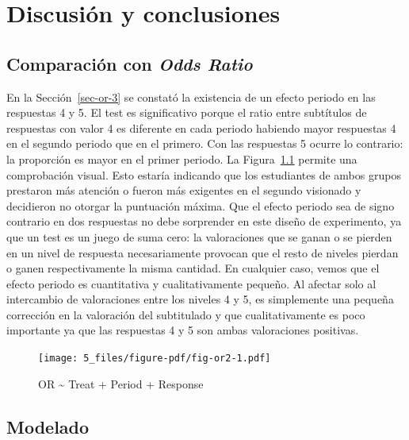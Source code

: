 \documentclass[
  12pt,
  a4paper,
  extrafontsizes,
  onecolumn,
  openright,
  table]{memoir}
\begin{document}
\normalsize


\hypertarget{sec-conclusiones}{%
\chapter{Discusión y conclusiones}\label{sec-conclusiones}}

\hypertarget{sec-or-4}{%
\section{\texorpdfstring{Comparación con \emph{Odds
Ratio}}{Comparación con Odds Ratio}}\label{sec-or-4}}

En la Sección~\ref{sec-or-3} se constató la existencia de un efecto
periodo en las respuestas 4 y 5. El test es significativo porque el
ratio entre subtítulos de respuestas con valor 4 es diferente en cada
periodo habiendo mayor respuestas 4 en el segundo periodo que en el
primero. Con las respuestas 5 ocurre lo contrario: la proporción es
mayor en el primer periodo. La Figura~\ref{fig-or2} permite una
comprobación visual. Esto estaría indicando que los estudiantes de ambos
grupos prestaron más atención o fueron más exigentes en el segundo
visionado y decidieron no otorgar la puntuación máxima. Que el efecto
periodo sea de signo contrario en dos respuestas no debe sorprender en
este diseño de experimento, ya que un test es un juego de suma cero: la
valoraciones que se ganan o se pierden en un nivel de respuesta
necesariamente provocan que el resto de niveles pierdan o ganen
respectivamente la misma cantidad. En cualquier caso, vemos que el
efecto periodo es cuantitativa y cualitativamente pequeño. Al afectar
solo al intercambio de valoraciones entre los niveles 4 y 5, es
simplemente una pequeña corrección en la valoración del subtitulado y
que cualitativamente es poco importante ya que las respuestas 4 y 5 son
ambas valoraciones positivas.

\begin{figure}[h]

{\centering \texttt{[image: 5\_files/figure-pdf/fig-or2-1.pdf]}

}

\caption{\label{fig-or2}OR \textasciitilde{} Treat + Period + Response}

\end{figure}

\hypertarget{modelado-1}{%
\section{Modelado}\label{modelado-1}}
\end{document}
